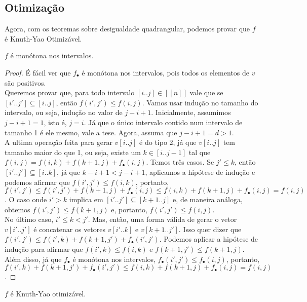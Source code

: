 \subsection{Otimização}

Agora, com os teoremas sobre desigualdade quadrangular, podemos provar que $f$ é Knuth-Yao Otimizável.

\begin{prop}
$f$ é monótona nos intervalos.
\end{prop}

\begin{proof}
É fácil ver que $f_\bullet$ é monótona nos intervalos, pois todos os elementos de $v$ são positivos. \\
Queremos provar que, para todo intervalo $[i..j] \in [[n]]$ vale que se $[i'..j'] \subseteq [i..j]$, então $f(i',j') \leq f(i,j)$. Vamos usar indução no tamanho do intervalo, ou seja, indução no valor de $j - i + 1$. Inicialmente, assumimos $j - i + 1 = 1$, isto é, $j = i$. Já que o único intervalo contido num intervalo de tamanho 1 é ele mesmo, vale a tese. Agora, assuma que $j - i + 1 = d > 1$. \\
A ultima operação feita para gerar $v[i..j]$ é do tipo 2, já que $v[i..j]$ tem tamanho maior do que 1, ou seja, existe um $k \in [i..j-1]$ tal que $f(i,j) = f(i,k) + f(k+1,j) + f_\bullet(i,j)$. Temos três casos. Se $j' \leq k$, então $[i'..j'] \subseteq [i..k]$, já que $k - i + 1 < j - i + 1$, aplicamos a hipótese de indução e podemos afirmar que $f(i',j') \leq f(i,k)$, portanto, $f(i',j') \leq f(i',j') + f(k+1,j) + f_\bullet(i,j) \leq f(i,k) + f(k+1,j) + f_\bullet(i,j) = f(i,j)$. O caso onde $i' > k$ implica em $[i'..j'] \subseteq [k+1..j]$ e, de maneira análoga, obtemos $f(i',j') \leq f(k+1,j)$ e, portanto, $f(i',j') \leq f(i,j)$. \\
No último caso, $i' \leq k < j'$. Mas, então, uma forma válida de gerar o vetor $v[i'..j']$ é concatenar os vetores $v[i'..k]$ e $v[k+1..j']$. Isso quer dizer que $f(i',j') \leq f(i',k) + f(k+1,j') + f_\bullet(i',j')$. Podemos aplicar a hipótese de indução para afirmar que $f(i',k) \leq f(i,k)$ e $f(k+1,j') \leq f(k+1,j)$. Além disso, já que $f_\bullet$ é monótona nos intervalos, $f_\bullet(i',j') \leq f_\bullet(i,j)$, portanto, $f(i',k) + f(k+1,j') + f_\bullet(i',j') \leq f(i,k) + f(k+1,j) + f_\bullet(i,j) = f(i,j)$.
\end{proof}

\begin{prop}
$f$ é Knuth-Yao otimizável.
\end{prop}

